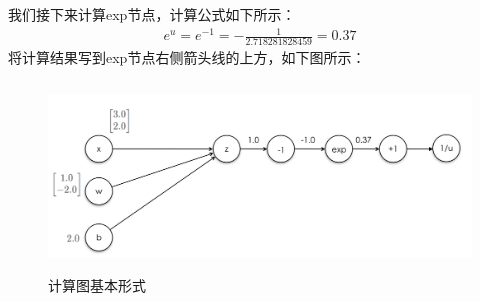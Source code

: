 \documentclass[UTF8]{article}
\begin{document}
我们接下来计算exp节点，计算公式如下所示：
\begin{equation}
\begin{aligned}
e^u=e^{-1}=-\frac{1}{2.71828 18284 59}=0.37
\end{aligned}
\label{mlp-sigmoid-cg-3}
\end{equation}
将计算结果写到exp节点右侧箭头线的上方，如下图所示：
\begin{figure}[H]
	\caption{计算图基本形式}
	\label{f000039}
	\centering
	\includegraphics[height=5cm]{images/f000039}
\end{figure}
\end{document}

